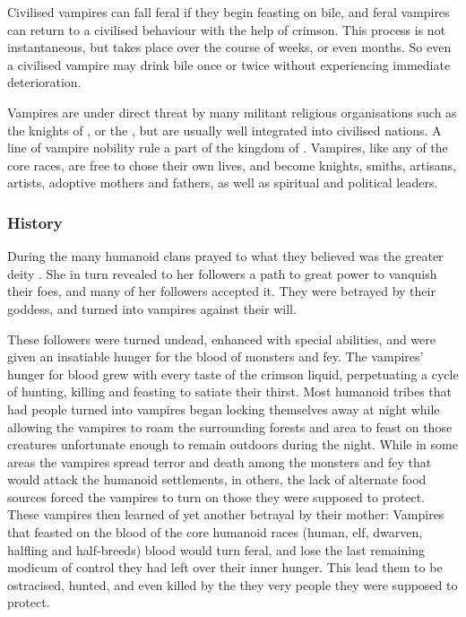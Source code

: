 Civilised vampires can fall feral if they begin feasting on bile, and feral
vampires can return to a civilised behaviour with the help of crimson. This
process is not instantaneous, but takes place over the course of weeks, or
even months. So even a civilised vampire may drink bile once or twice without
experiencing immediate deterioration.

Vampires are under direct threat by many militant religious organisations such
as the knights of , or the , but are
usually well integrated into civilised nations. A line of vampire nobility
rule a part of the kingdom of . Vampires, like any of
the core races, are free to chose their own lives, and become knights, smiths,
artisans, artists, adoptive mothers and fathers, as well as spiritual and
political leaders.

\subsubsection{History}

During the  many humanoid clans prayed to what
they believed was the greater deity . She in turn revealed
to her followers a path to great power to vanquish their foes, and many of her
followers accepted it. They were betrayed by their goddess, and turned into
vampires against their will.

These followers were turned undead, enhanced with special abilities, and were
given an insatiable hunger for the blood of monsters and fey. The vampires'
hunger for blood grew with every taste of the crimson liquid, perpetuating a
cycle of hunting, killing and feasting to satiate their thirst. Most humanoid
tribes that had people turned into vampires began locking themselves away at
night while allowing the vampires to roam the surrounding forests and area to
feast on those creatures unfortunate enough to remain outdoors during the
night. While in some areas the vampires spread terror and death among the
monsters and fey that would attack the humanoid settlements, in others, the
lack of alternate food sources forced the vampires to turn on those they were
supposed to protect. These vampires then learned of yet another betrayal by
their mother: Vampires that feasted on the blood of the core humanoid races
(human, elf, dwarven, halfling and half-breeds) blood would turn feral, and
lose the last remaining modicum of control they had left over their inner
hunger. This lead them to be ostracised, hunted, and even killed by the they
very people they were supposed to protect.

